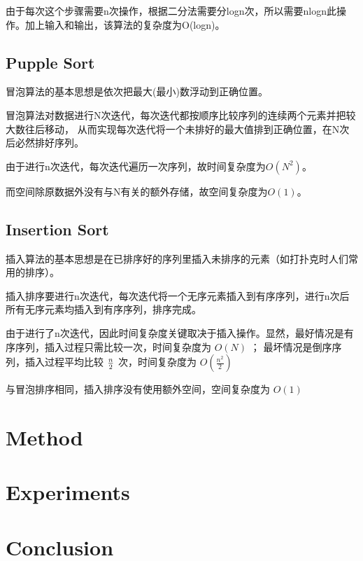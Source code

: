 \documentclass[UTF8]{ctexart}
\begin{document}
由于每次这个步骤需要n次操作，根据二分法需要分logn次，所以需要nlogn此操作。加上输入和输出，该算法的复杂度为O(logn)。

\subsection{Pupple Sort}
\label{subsec:pupplesort}
冒泡算法的基本思想是依次把最大(最小)数浮动到正确位置。

冒泡算法对数据进行N次迭代，每次迭代都按顺序比较序列的连续两个元素并把较大数往后移动，
从而实现每次迭代将一个未排好的最大值排到正确位置，在N次后必然排好序列。

由于进行n次迭代，每次迭代遍历一次序列，故时间复杂度为$O(N^2)$。

而空间除原数据外没有与N有关的额外存储，故空间复杂度为$O(1)$。

\subsection{Insertion Sort}
\label{subsec:insertionsort}
插入算法的基本思想是在已排序好的序列里插入未排序的元素（如打扑克时人们常用的排序）。

插入排序要进行n次迭代，每次迭代将一个无序元素插入到有序序列，进行n次后所有无序元素均插入到有序序列，排序完成。

由于进行了n次迭代，因此时间复杂度关键取决于插入操作。显然，最好情况是有序序列，插入过程只需比较一次，时间复杂度为 $O(N)$ ；
最坏情况是倒序序列，插入过程平均比较 $n \over 2$ 次，时间复杂度为 $O(\frac{n^2}{2})$

与冒泡排序相同，插入排序没有使用额外空间，空间复杂度为 $O(1)$

\section{Method}
\label{sec:method}

\section{Experiments}
\label{sec:experiments}

\section{Conclusion}
\label{sec:conclusion}
\end{document}
